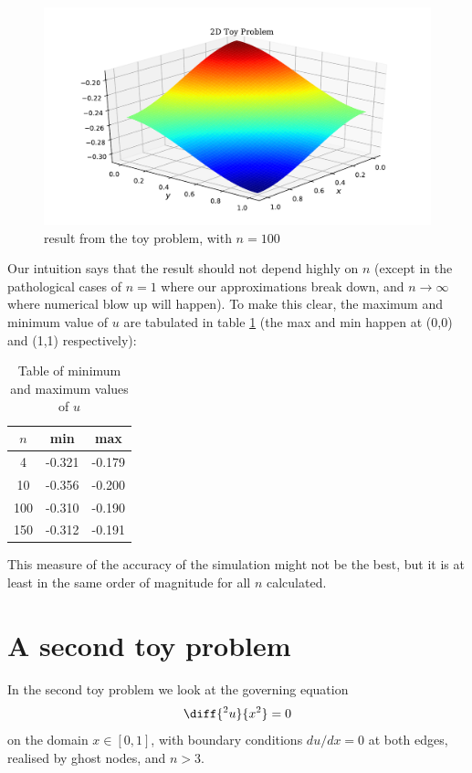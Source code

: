 \documentclass[sigconf]{acmart}
\begin{document}
\begin{figure}
	\centering
	\includegraphics[width=\linewidth]{result3.pdf}
	\caption{result from the toy problem, with $ n=100 $}
	\label{fig:result3}
\end{figure}

Our intuition says that the result should not depend highly on $ n $ (except in the pathological cases of $ n = 1 $ where our approximations break down, and $ n \to \infty $ where numerical blow up will happen). To make this clear, the maximum and minimum value of $ u $ are tabulated in table \ref{tab:min_max} (the max and min happen at (0,0) and (1,1) respectively):
\begin{table}
	\centering
	\begin{tabular}{ccc}
		\hline
		$ n $ & min & max \\
		\hline
		4 & -0.321 & -0.179 \\
		10 & -0.356 & -0.200 \\
		100 & -0.310 & -0.190 \\
		150 & -0.312 & -0.191 \\
		\hline 
	\end{tabular}
	\caption{Table of minimum and maximum values of $ u $}
	\label{tab:min_max}
\end{table}
This measure of the accuracy of the simulation might not be the best, but it is at least in the same order of magnitude for all $ n $ calculated.


\section{A second toy problem}
In the second toy problem we look at the governing equation
\begin{equation}\label{key}
	\diff{^2 u}{x^2} = 0
\end{equation}
on the domain $ x \in [0,1] $, with boundary conditions $ du/dx=0 $ at both edges, realised by ghost nodes, and $ n>3 $.
\end{document}
